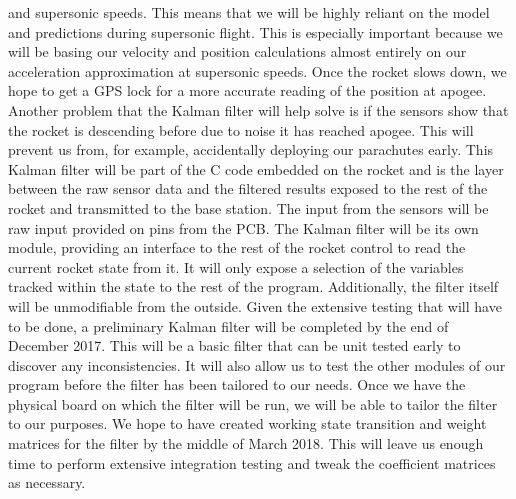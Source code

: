 \documentclass[onecolumn, draftclsnofoot,10pt, compsoc]{IEEEtran}
\begin{document}
and supersonic speeds.
This means that we will be highly reliant on the model and predictions
during supersonic flight.
This is especially important because we will be basing our velocity
and position calculations almost entirely on our acceleration
approximation at supersonic speeds.
Once the rocket slows down, we hope to get a GPS lock for a more
accurate reading of the position at apogee.
Another problem that the Kalman filter will help solve is if the
sensors show that the rocket is descending before due to noise it has
reached apogee.
This will prevent us from, for example, accidentally deploying our
parachutes early.
This Kalman filter will be part of the C code embedded on the rocket
and is the layer between the raw sensor data and the filtered results
exposed to the rest of the rocket and transmitted to the base station.
The input from the sensors will be raw input provided on pins from the PCB.
The Kalman filter will be its own module, providing an interface to
the rest of the rocket control to read the current rocket state from
it.
It will only expose a selection of the variables tracked within the
state to the rest of the program.
Additionally, the filter itself will be unmodifiable from the outside.
Given the extensive testing that will have to be done, a preliminary
Kalman filter will be completed by the end of December 2017.
This will be a basic filter that can be unit tested early to discover
any inconsistencies.
It will also allow us to test the other modules of our program before
the filter has been tailored to our needs.
Once we have the physical board on which the filter will be run, we
will be able to tailor the filter to our purposes.
We hope to have created working state transition and weight matrices
for the filter by the middle of March 2018.
This will leave us enough time to perform extensive integration
testing and tweak the coefficient matrices as necessary.
\end{document}
